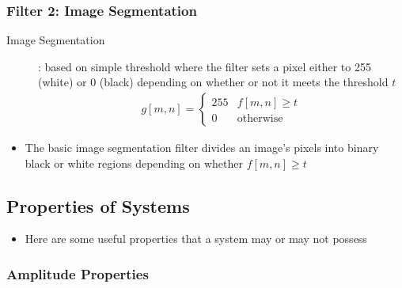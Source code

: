 \documentclass[letterpaper,12pt]{article}
\begin{document}
\subsubsection{Filter 2: Image Segmentation}
\begin{description}
 \item[Image Segmentation]: based on simple threshold where the filter sets a pixel either to 255 (white) or 0 (black) depending on whether or not it meets the threshold $t$
       \begin{align}
        g[m, n] = \begin{cases} 255 & f[m, n] \geq t \\ 0 & \text{otherwise}\end{cases} \tag{Threshold}
       \end{align}
\end{description}
\begin{itemize}
 \item The basic image segmentation filter divides an image's pixels into binary black or white regions depending on whether $f[m, n] \geq t$
\end{itemize}

\subsection{Properties of Systems}
\begin{itemize}
 \item Here are some useful properties that a system may or may not possess
\end{itemize}

\subsubsection{Amplitude Properties}
\end{document}
